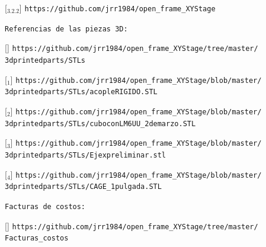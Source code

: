 [\href{https://github.com/jrr1984/open\_frame\_XYStage}{\faGithub$_{3.2.2}$}] \texttt{https://github.com/jrr1984/open\_frame\_XYStage}

\newpage
\texttt{Referencias de las piezas 3D:}

[\href{https://github.com/jrr1984/open\_frame\_XYStage/tree/master/3dprintedparts/STLs}{\faCubes}] \texttt{https://github.com/jrr1984/open\_frame\_XYStage/tree/master/\\\hspace{1.5cm}3dprintedparts/STLs}

[\href{https://github.com/jrr1984/open\_frame\_XYStage/blob/master/3dprintedparts/STLs/acopleRIGIDO.STL}{\faCubes$_{1}$}] \texttt{https://github.com/jrr1984/open\_frame\_XYStage/blob/master/\\\hspace{1.5cm}3dprintedparts/STLs/acopleRIGIDO.STL}

[\href{https://github.com/jrr1984/open\_frame\_XYStage/blob/master/3dprintedparts/STLs/cuboconLM6UU\_2demarzo.STL}{\faCubes$_{2}$}] \texttt{https://github.com/jrr1984/open\_frame\_XYStage/blob/master/\\\hspace{1.5cm}3dprintedparts/STLs/cuboconLM6UU\_2demarzo.STL}

[\href{https://github.com/jrr1984/open\_frame\_XYStage/blob/master/3dprintedparts/STLs/Ejexpreliminar.stl}{\faCubes$_{3}$}] \texttt{https://github.com/jrr1984/open\_frame\_XYStage/blob/master/\\\hspace{1.5cm}3dprintedparts/STLs/Ejexpreliminar.stl}

[\href{https://github.com/jrr1984/open\_frame\_XYStage/blob/master/3dprintedparts/STLs/CAGE\_1pulgada.STL}{\faCubes$_{4}$}] \texttt{https://github.com/jrr1984/open\_frame\_XYStage/blob/master/\\\hspace{1.5cm}3dprintedparts/STLs/CAGE\_1pulgada.STL}

\texttt{Facturas de costos:}

[\href{https://github.com/jrr1984/open\_frame\_XYStage/tree/master/Facturas\_costos}{\faMoneyCheck}] \texttt{https://github.com/jrr1984/open\_frame\_XYStage/tree/master/\\\hspace{1.5cm}Facturas\_costos}






